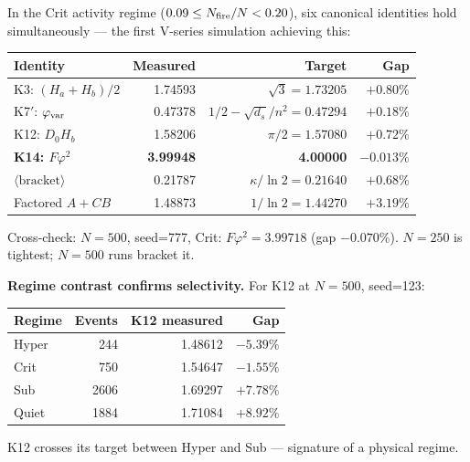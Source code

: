 \documentclass[12pt, a4paper]{article}
\begin{document}
\begin{derivedbox}[title={K14 at Critical Window: 0.013\% (V21.2, N=250, seed=42)}]
In the Crit activity regime ($0.09 \leq N_{\rm fire}/N < 0.20$), six canonical identities hold simultaneously --- the first V-series simulation achieving this:

\begin{center}
\renewcommand{\arraystretch}{1.2}
\begin{tabular}{p{4.7cm} r r r}
\toprule
\textbf{Identity} & \textbf{Measured} & \textbf{Target} & \textbf{Gap} \\
\midrule
K3: $(H_a+H_b)/2$ & 1.74593 & $\sqrt{3}=1.73205$ & $+0.80\%$ \\
K7$'$: $\varphi_{\rm var}$ & 0.47378 & $1/2-\sqrt{d_s}/n^2=0.47294$ & $+0.18\%$ \\
K12: $D_0 H_b$ & 1.58206 & $\pi/2=1.57080$ & $+0.72\%$ \\
\textbf{K14: $F\varphi^2$} & \textbf{3.99948} & \textbf{4.00000} & $\mathbf{-0.013\%}$ \\
$\langle\text{bracket}\rangle$ & 0.21787 & $\kappa/\ln 2=0.21640$ & $+0.68\%$ \\
Factored $A+CB$ & 1.48873 & $1/\ln 2=1.44270$ & $+3.19\%$ \\
\bottomrule
\end{tabular}
\end{center}

Cross-check: $N=500$, seed=777, Crit: $F\varphi^2 = 3.99718$ (gap $-0.070\%$). $N=250$ is tightest; $N=500$ runs bracket it.

\textbf{Regime contrast confirms selectivity.} For K12 at $N=500$, seed=123:

\begin{center}
\begin{tabular}{lrrr}
\toprule
Regime & Events & K12 measured & Gap \\
\midrule
Hyper & 244 & 1.48612 & $-5.39\%$ \\
Crit  & 750 & 1.54647 & $-1.55\%$ \\
Sub   & 2606 & 1.69297 & $+7.78\%$ \\
Quiet & 1884 & 1.71084 & $+8.92\%$ \\
\bottomrule
\end{tabular}
\end{center}

K12 crosses its target between Hyper and Sub --- signature of a physical regime.
\end{derivedbox}
\end{document}
